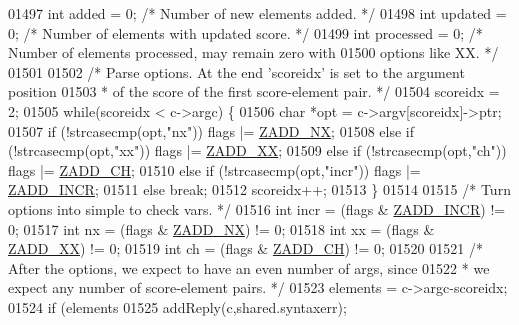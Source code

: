 \begin{DoxyCode}
01497     \textcolor{keywordtype}{int} added = 0;      \textcolor{comment}{/* Number of new elements added. */}
01498     \textcolor{keywordtype}{int} updated = 0;    \textcolor{comment}{/* Number of elements with updated score. */}
01499     \textcolor{keywordtype}{int} processed = 0;  \textcolor{comment}{/* Number of elements processed, may remain zero with}
01500 \textcolor{comment}{                           options like XX. */}
01501 
01502     \textcolor{comment}{/* Parse options. At the end 'scoreidx' is set to the argument position}
01503 \textcolor{comment}{     * of the score of the first score-element pair. */}
01504     scoreidx = 2;
01505     \textcolor{keywordflow}{while}(scoreidx < c->argc) \{
01506         \textcolor{keywordtype}{char} *opt = c->argv[scoreidx]->ptr;
01507         \textcolor{keywordflow}{if} (!strcasecmp(opt,\textcolor{stringliteral}{"nx"})) flags |= \hyperlink{server_8h_a708539c0c5926d4c12c4bb2bb45513b2}{ZADD\_NX};
01508         \textcolor{keywordflow}{else} \textcolor{keywordflow}{if} (!strcasecmp(opt,\textcolor{stringliteral}{"xx"})) flags |= \hyperlink{server_8h_a4bc45df3143a1110ca9b8a67d25f47eb}{ZADD\_XX};
01509         \textcolor{keywordflow}{else} \textcolor{keywordflow}{if} (!strcasecmp(opt,\textcolor{stringliteral}{"ch"})) flags |= \hyperlink{server_8h_ac1b2fe32c997eff75e263e6689e15d2e}{ZADD\_CH};
01510         \textcolor{keywordflow}{else} \textcolor{keywordflow}{if} (!strcasecmp(opt,\textcolor{stringliteral}{"incr"})) flags |= \hyperlink{server_8h_aa31f5564c57b55123a4e2d6a5eb599cf}{ZADD\_INCR};
01511         \textcolor{keywordflow}{else} \textcolor{keywordflow}{break};
01512         scoreidx++;
01513     \}
01514 
01515     \textcolor{comment}{/* Turn options into simple to check vars. */}
01516     \textcolor{keywordtype}{int} incr = (flags & \hyperlink{server_8h_aa31f5564c57b55123a4e2d6a5eb599cf}{ZADD\_INCR}) != 0;
01517     \textcolor{keywordtype}{int} nx = (flags & \hyperlink{server_8h_a708539c0c5926d4c12c4bb2bb45513b2}{ZADD\_NX}) != 0;
01518     \textcolor{keywordtype}{int} xx = (flags & \hyperlink{server_8h_a4bc45df3143a1110ca9b8a67d25f47eb}{ZADD\_XX}) != 0;
01519     \textcolor{keywordtype}{int} ch = (flags & \hyperlink{server_8h_ac1b2fe32c997eff75e263e6689e15d2e}{ZADD\_CH}) != 0;
01520 
01521     \textcolor{comment}{/* After the options, we expect to have an even number of args, since}
01522 \textcolor{comment}{     * we expect any number of score-element pairs. */}
01523     elements = c->argc-scoreidx;
01524     \textcolor{keywordflow}{if} (elements %
01525         addReply(c,shared.syntaxerr);

\end{DoxyCode}
